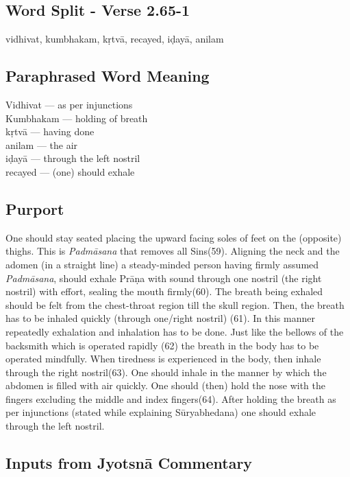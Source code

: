 \subsection*{Word Split - Verse 2.65-1}

vidhivat, kumbhakam, kṛtvā, recayed, iḍayā, anilam

\subsection*{Paraphrased Word Meaning}

\begin{multicols}{2}
Vidhivat --- as per injunctions\\
Kumbhakam --- holding of breath \\
kṛtvā --- having done \\
anilam --- the air \\
iḍayā --- through the left nostril\\
recayed --- (one) should exhale
\end{multicols}

\subsection*{Purport}


One should stay seated placing the upward facing soles of feet on the (opposite) thighs. This is \textit{Padmāsana} that removes all Sins(59). Aligning the neck and the adomen (in a straight line) a steady-minded person having firmly assumed \textit{Padmāsana}, should exhale Prāṇa with sound through one nostril (the right nostril) with effort, sealing the mouth firmly(60). The breath being exhaled should be felt from the chest-throat region till the skull region. Then, the breath has to be inhaled quickly (through one/right nostril) (61). In this manner repeatedly exhalation and inhalation has to be done. Just like the bellows of the backsmith which is operated rapidly (62) the breath in the body has to be operated mindfully. When tiredness is experienced in the body, then inhale through the right nostril(63). One should inhale in the manner by which the abdomen is filled with air quickly. One should (then) hold the nose with the fingers excluding the middle and index fingers(64). After holding the breath as per injunctions (stated while explaining Sūryabhedana) one should exhale through the left nostril.

\subsection*{Inputs from Jyotsnā Commentary}


